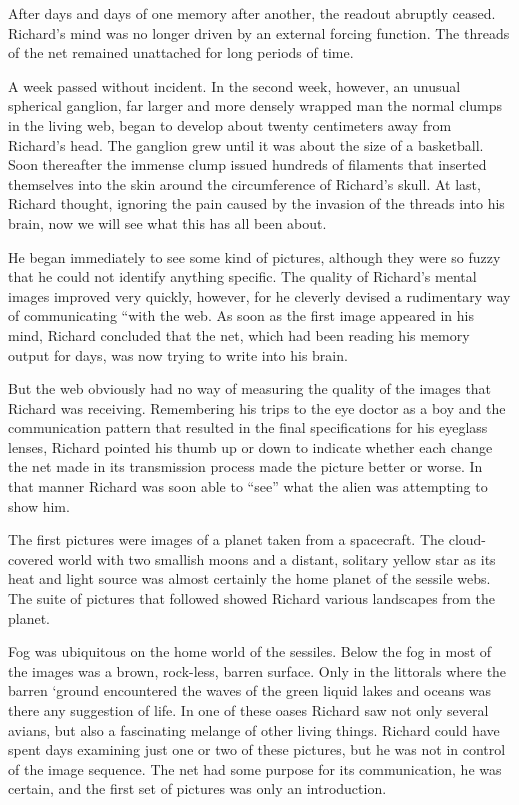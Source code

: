 \documentclass[]{article}
\begin{document}
{{After days and days of one memory after another, the readout abruptly ceased. Richard’s mind was no longer driven by an external forcing function. The threads of the net remained unattached for long periods of time.

A week passed without incident. In the second week, however, an unusual spherical ganglion, far larger and more densely wrapped man the normal clumps in the living web, began to develop about twenty centimeters away from Richard’s head. The ganglion grew until it was about the size of a basketball. Soon thereafter the immense clump issued hundreds of filaments that inserted themselves into the skin around the circumference of Richard’s skull. At last, Richard thought, ignoring the pain caused by the invasion of the threads into his brain, now we will see what this has all been about.

He began immediately to see some kind of pictures, although they were so fuzzy that he could not identify anything specific. The quality of Richard’s mental images improved very quickly, however, for he cleverly devised a rudimentary way of communicating “with the web. As soon as the first image appeared in his mind, Richard concluded that the net, which had been reading his memory output for days, was now trying to write into his brain.

But the web obviously had no way of measuring the quality of the images that Richard was receiving. Remembering his trips to the eye doctor as a boy and the communication pattern that resulted in the final specifications for his eyeglass lenses, Richard pointed his thumb up or down to indicate whether each change the net made in its transmission process made the picture better or worse. In that manner Richard was soon able to “see” what the alien was attempting to show him.

The first pictures were images of a planet taken from a spacecraft. The cloud-covered world with two smallish moons and a distant, solitary yellow star as its heat and light source was almost certainly the home planet of the sessile webs. The suite of pictures that followed showed Richard various landscapes from the planet.

Fog was ubiquitous on the home world of the sessiles. Below the fog in most of the images was a brown, rock-less, barren surface. Only in the littorals where the barren ‘ground encountered the waves of the green liquid lakes and oceans was there any suggestion of life. In one of these oases Richard saw not only several avians, but also a fascinating melange of other living things. Richard could have spent days examining just one or two of these pictures, but he was not in control of the image sequence. The net had some purpose for its communication, he was certain, and the first set of pictures was only an introduction.

}}
\end{document}
